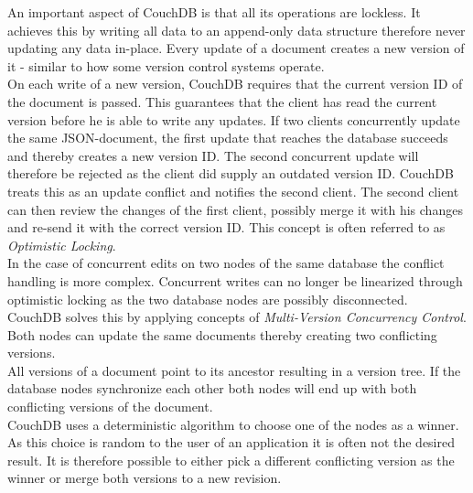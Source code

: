 An important aspect of CouchDB is that all its operations are lockless.
It achieves this by writing all data to an append-only data structure therefore never updating any data in-place.
Every update of a document creates a new version of it - similar to how some version control systems operate.\\
On each write of a new version, CouchDB requires that the current version ID of the document is passed.
This guarantees that the client has read the current version before he is able to write any updates.
If two clients concurrently update the same JSON-document, the first update that reaches the database succeeds and thereby creates a new version ID.
The second concurrent update will therefore be rejected as the client did supply an outdated version ID.
CouchDB treats this as an update conflict and notifies the second client.
The second client can then review the changes of the first client, possibly merge it with his changes and re-send it with the correct version ID.
This concept is often referred to as \emph{Optimistic Locking}.\\

In the case of concurrent edits on two nodes of the same database the conflict handling is more complex.
Concurrent writes can no longer be linearized through optimistic locking as the two database nodes are possibly disconnected.\\
CouchDB solves this by applying concepts of \emph{Multi-Version Concurrency Control}.
Both nodes can update the same documents thereby creating two conflicting versions.\\
All versions of a document point to its ancestor resulting in a version tree.
If the database nodes synchronize each other both nodes will end up with both conflicting versions of the document.\\
CouchDB uses a deterministic algorithm to choose one of the nodes as a winner.
As this choice is random to the user of an application it is often not the desired result.
It is therefore possible to either pick a different conflicting version as the winner or merge both versions to a new revision.

